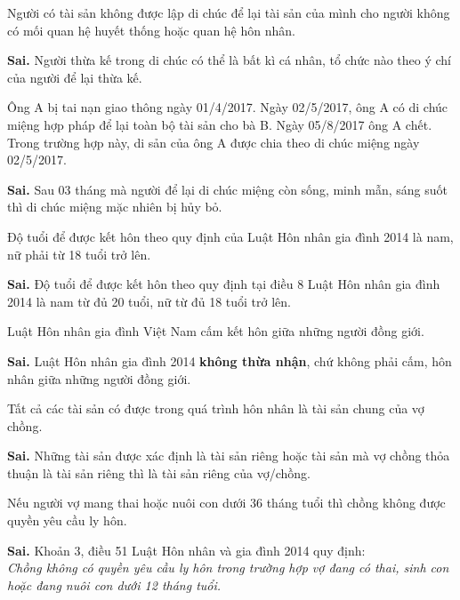 \begin{ques}
Người có tài sản không được lập di chúc để lại tài sản của mình cho người không có mối quan hệ huyết thống hoặc quan hệ hôn nhân.
\end{ques}
\begin{ans}
\textbf{Sai.} Người thừa kế trong di chúc có thể là bất kì cá nhân, tổ chức nào theo ý chí của người để lại thừa kế.
\end{ans}

\begin{ques}
Ông A bị tai nạn giao thông ngày 01/4/2017. Ngày 02/5/2017, ông A có di chúc miệng hợp pháp để lại toàn bộ tài sản cho bà B. Ngày 05/8/2017 ông A chết. Trong trường hợp này, di sản của ông A được chia theo di chúc miệng ngày 02/5/2017.
\end{ques}
\begin{ans}
\textbf{Sai.} Sau 03 tháng mà người để lại di chúc miệng còn sống, minh mẫn, sáng suốt thì di chúc miệng mặc nhiên bị hủy bỏ.
\end{ans}

\begin{ques}
Độ tuổi để được kết hôn theo quy định của Luật Hôn nhân gia đình 2014 là nam, nữ phải từ 18 tuổi trở lên.
\end{ques}
\begin{ans}
\textbf{Sai.} Độ tuổi để được kết hôn theo quy định tại điều 8 Luật Hôn nhân gia đình 2014 là nam từ đủ 20 tuổi, nữ từ đủ 18 tuổi trở lên.
\end{ans}

\begin{ques}
Luật Hôn nhân gia đình Việt Nam cấm kết hôn giữa những người đồng giới.
\end{ques}
\begin{ans}
\textbf{Sai.} Luật Hôn nhân gia đình 2014 \textbf{không thừa nhận}, chứ không phải cấm, hôn nhân giữa những người đồng giới.
\end{ans}

\begin{ques}
Tất cả các tài sản có được trong quá trình hôn nhân là tài sản chung của vợ chồng.
\end{ques}
\begin{ans}
\textbf{Sai.} Những tài sản được xác định là tài sản riêng hoặc tài sản mà vợ chồng thỏa thuận là tài sản riêng thì là tài sản riêng của vợ/chồng.
\end{ans}

\begin{ques}
Nếu người vợ mang thai hoặc nuôi con dưới 36 tháng tuổi thì chồng không được quyền yêu cầu ly hôn.
\end{ques}
\begin{ans}
\textbf{Sai.} Khoản 3, điều 51 Luật Hôn nhân và gia đình 2014 quy định:\\
\textit{Chồng không có quyền yêu cầu ly hôn trong trường hợp vợ đang có thai, sinh con hoặc đang nuôi con dưới 12 tháng tuổi.}
\end{ans}

